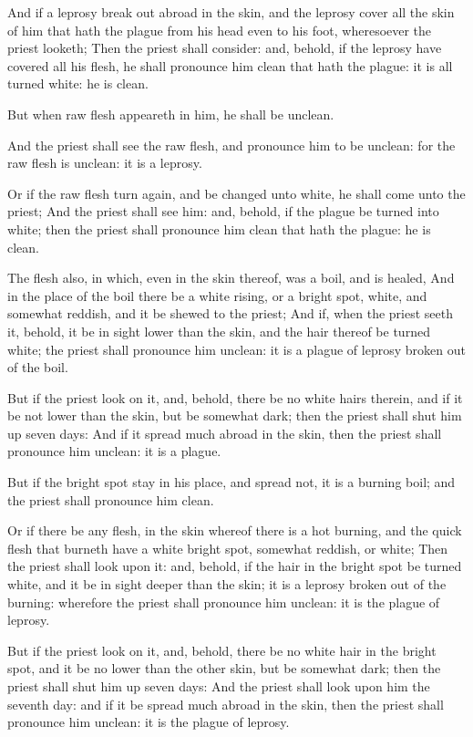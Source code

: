 \Verse And if a leprosy break out abroad in the skin, and the leprosy cover all the skin of him that hath the plague from his head even to his foot, wheresoever the priest looketh; \Verse Then the priest shall consider: and, behold, if the leprosy have covered all his flesh, he shall pronounce him clean that hath the plague: it is all turned white: he is clean.

\Verse But when raw flesh appeareth in him, he shall be unclean.

\Verse And the priest shall see the raw flesh, and pronounce him to be unclean: for the raw flesh is unclean: it is a leprosy.

\Verse Or if the raw flesh turn again, and be changed unto white, he shall come unto the priest; \Verse And the priest shall see him: and, behold, if the plague be turned into white; then the priest shall pronounce him clean that hath the plague: he is clean.

\Verse The flesh also, in which, even in the skin thereof, was a boil, and is healed, \Verse And in the place of the boil there be a white rising, or a bright spot, white, and somewhat reddish, and it be shewed to the priest; \Verse And if, when the priest seeth it, behold, it be in sight lower than the skin, and the hair thereof be turned white; the priest shall pronounce him unclean: it is a plague of leprosy broken out of the boil.

\Verse But if the priest look on it, and, behold, there be no white hairs therein, and if it be not lower than the skin, but be somewhat dark; then the priest shall shut him up seven days: \Verse And if it spread much abroad in the skin, then the priest shall pronounce him unclean: it is a plague.

\Verse But if the bright spot stay in his place, and spread not, it is a burning boil; and the priest shall pronounce him clean.

\Verse Or if there be any flesh, in the skin whereof there is a hot burning, and the quick flesh that burneth have a white bright spot, somewhat reddish, or white; \Verse Then the priest shall look upon it: and, behold, if the hair in the bright spot be turned white, and it be in sight deeper than the skin; it is a leprosy broken out of the burning: wherefore the priest shall pronounce him unclean: it is the plague of leprosy.

\Verse But if the priest look on it, and, behold, there be no white hair in the bright spot, and it be no lower than the other skin, but be somewhat dark; then the priest shall shut him up seven days: \Verse And the priest shall look upon him the seventh day: and if it be spread much abroad in the skin, then the priest shall pronounce him unclean: it is the plague of leprosy.


